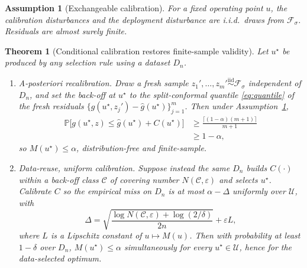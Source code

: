 \documentclass[journal]{IEEEtran}
\newtheorem{theorem}{Theorem}
\newtheorem{assumption}{Assumption}
\begin{document}
\begin{assumption}[Exchangeable calibration]
\label{ass:exch}
For a fixed operating point $u$, the calibration disturbances and the deployment disturbance are
i.i.d.\ draws from $\mathcal F_\sigma$. Residuals are almost surely finite.
\end{assumption}

\begin{theorem}[Conditional calibration restores finite-sample validity]
\label{thm:repair}
Let $u^\star$ be produced by any selection rule using a dataset $D_n$.
\begin{enumerate}
\item[(a)] \emph{A-posteriori recalibration.} Draw a fresh sample
$z_1',\dots,z_m'\stackrel{\text{iid}}{\sim}\mathcal F_\sigma$ independent of $D_n$, and set the
back-off at $u^\star$ to the split-conformal quantile \eqref{eq:quantile} of the fresh residuals
$\{g(u^\star,z_j')-\hat g(u^\star)\}_{j=1}^m$. Then under Assumption~\ref{ass:exch},
\begin{align*}
\mathbb P\big[g(u^\star,z)\le\hat g(u^\star)+C(u^\star)\big]
&\ge \frac{\lceil(1-\alpha)(m+1)\rceil}{m+1}\\
&\ge 1-\alpha,
\end{align*}
so $M(u^\star)\le\alpha$, distribution-free and finite-sample.
\item[(b)] \emph{Data-reuse, uniform calibration.} Suppose instead the same $D_n$ builds
$C(\cdot)$ within a back-off class $\mathcal C$ of covering number $N(\mathcal C,\varepsilon)$ and
selects $u^\star$. Calibrate $C$ so the empirical miss on $D_n$ is at most $\alpha-\Delta$
uniformly over $\mathcal U$, with
\[
\Delta=\sqrt{\frac{\log N(\mathcal C,\varepsilon)+\log(2/\delta)}{2n}}+\varepsilon L,
\]
where $L$ is a Lipschitz constant of $u\mapsto M(u)$. Then with probability at least $1-\delta$
over $D_n$, $M(u^\star)\le\alpha$ simultaneously for every $u^\star\in\mathcal U$, hence for the
data-selected optimum.
\end{enumerate}
\end{theorem}
\end{document}
